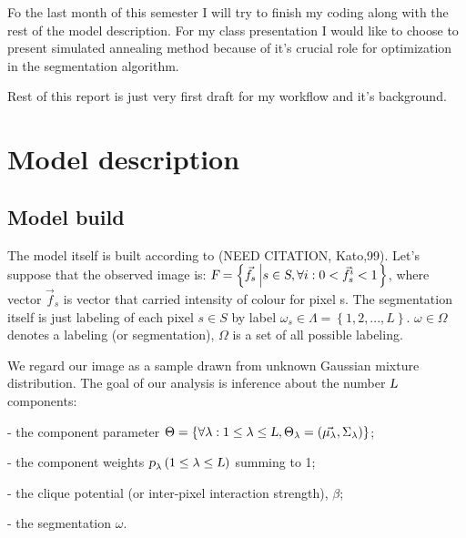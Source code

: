 \documentclass{article}
\begin{document}
Fo the last month of this semester I will try to finish my coding along with the rest of the model description. For my class presentation I would like to choose to present simulated annealing method because of it's crucial role for optimization in the segmentation algorithm.

Rest of this report is just very first draft for my workflow and it's background.

\section{Model description}
\subsection{Model build}
The model itself is built according to (NEED CITATION, Kato,99).
Let's suppose that the observed image is:
$\textsl{F} = \left\{ \vec{f}_{s} \left| s \in \textsl{S}, \forall i : 0 < \vec{f}^{i}_{s} < 1 \right. \right\}$,
where vector $\vec{f}_{s}$ is vector that carried intensity of colour for pixel s. The segmentation itself is just labeling of each pixel $s \in S$ by label $\omega_{s} \in \Lambda = \left\{ 1,2,...,L \right\}$. $\omega\in\Omega$ denotes a labeling (or segmentation), $\Omega$ is a set of all possible labeling.

We regard our image as a sample drawn from unknown Gaussian mixture distribution. The goal of our analysis is inference about the number 
$\textsl{L}$ 
components:

- the component parameter $\Theta = \left\{\forall\lambda : 1\leq \lambda \leq \textsl{L}, \Theta_{\lambda}=\left(\vec{\mu_{\lambda}},\Sigma_{\lambda} \right) \right\}$;


- the component weights $\textsl p_{\lambda}\left(1\leq\lambda\leq \textsl L \right)$ summing to 1;

- the clique potential (or inter-pixel interaction strength), $\beta$;
 
- the segmentation $\omega$.
\end{document}
